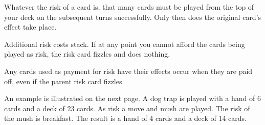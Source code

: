 \documentclass{article}
\begin{document}
Whatever the risk of a card is, that many cards must be played from the top of
your deck on the subsequent turns successfully. Only then does the original
card's effect take place.

Additional risk costs stack. If at any point you cannot afford the cards being
played as risk, the risk card fizzles and does nothing.

Any cards used as payment for risk have their effects occur when they are paid
off, even if the parent risk card fizzles.

An example is illustrated on the next page. A dog trap is played with a hand of
6 cards and a deck of 23 cards. As risk a move and mush are played. The risk of
the mush is breakfast. The result is a hand of 4 cards and a deck of 14 cards.

\clearpage
\end{document}

